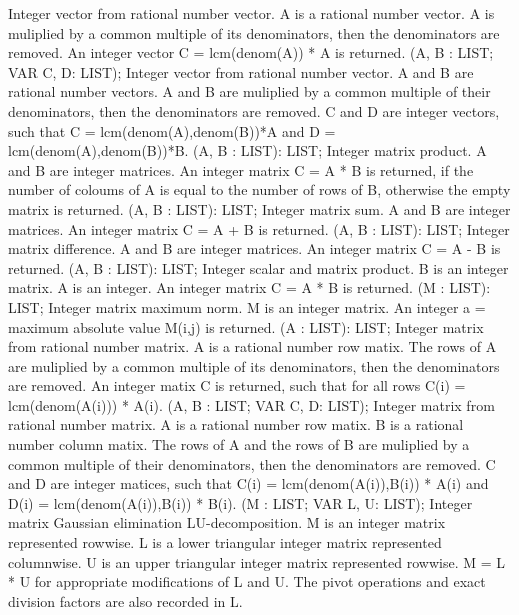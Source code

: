 \bcom Integer vector from rational number vector. A is a rational
number vector. A is muliplied by a common multiple of its 
denominators, then the denominators are removed. An integer 
vector C = lcm(denom(A)) * A is returned.  \ecom 
{} (A, B : LIST; VAR C, D: LIST); \eproc
\bcom Integer vector from rational number vector. A and B are
rational number vectors. A and B are muliplied by a common 
multiple of their denominators, then the denominators are 
removed. C and D are integer vectors, such that 
C = lcm(denom(A),denom(B))*A and D = lcm(denom(A),denom(B))*B.  \ecom 
{} (A, B : LIST): LIST; \eproc
\bcom Integer matrix product. A and B are integer matrices.
An integer matrix C = A * B is returned, if the number of 
coloums of A is equal to the number of rows of B, 
otherwise the empty matrix is returned.  \ecom 
{} (A, B : LIST): LIST; \eproc
\bcom Integer matrix sum. A and B are integer matrices.
An integer matrix C = A + B is returned.  \ecom 
{} (A, B : LIST): LIST; \eproc
\bcom Integer matrix difference. A and B are integer matrices.
An integer matrix C = A - B is returned.  \ecom 
{} (A, B : LIST): LIST; \eproc
\bcom Integer scalar and matrix product. B is an integer matrix.
A is an integer. An integer matrix C = A * B is returned.  \ecom 
{} (M : LIST): LIST; \eproc
\bcom Integer matrix maximum norm. M is an integer matrix.
An integer a = maximum absolute value M(i,j) is returned.  \ecom 
{} (A : LIST): LIST; \eproc
\bcom Integer matrix from rational number matrix. A is a rational
number row matix. The rows of A are muliplied by a common 
multiple of its denominators, then the denominators are 
removed. An integer matix C is returned, such that for 
all rows C(i) = lcm(denom(A(i))) * A(i).  \ecom 
{} (A, B : LIST; VAR C, D: LIST); \eproc
\bcom Integer matrix from rational number matrix. A is a rational
number row matix. B is a rational number column matix. 
The rows of A and the rows of B are muliplied by
a common multiple of their denominators, then the 
denominators are removed. C and D are integer matices,
such that C(i) = lcm(denom(A(i)),B(i)) * A(i) and
D(i) = lcm(denom(A(i)),B(i)) * B(i).  \ecom 
{} (M : LIST; VAR L, U: LIST); \eproc
\bcom Integer matrix Gaussian elimination LU-decomposition.
M is an integer matrix represented rowwise. L is a lower 
triangular integer matrix represented columnwise.
U is an upper triangular integer matrix represented rowwise.
M = L * U for appropriate modifications of L and U. The pivot 
operations and exact division factors are also recorded in L.  \ecom 

